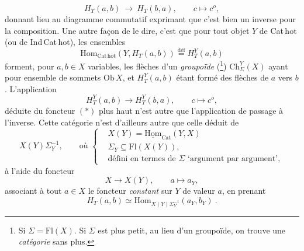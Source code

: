 \[
H_{T}(a,b) \ \longrightarrow\ H_{T}(b,a), \qquad c \longmapsto c^{o}, \tag*{$(*)$}
\]
donnant lieu au diagramme commutatif exprimant que c'est bien un inverse pour la composition. Une autre façon de le dire, c'est que pour tout objet $Y$ de Cat\,hot (ou de Ind\,Cat\,hot), les ensembles
\[
\mathrm{Hom}_{\mathrm{Cat\,hot}}(Y, H_{T}(a,b)) \overset{\text{déf}}{=} H_{T}^{Y}(a,b)
\]
forment, pour $a,b \in X$ variables, les flèches d'un \textit{groupoïde} (\footnote[25]{Si $\Sigma = \mathrm{Fl}(X)$. Si $\Sigma$ est plus petit, au lieu d'un groupoïde, on trouve une \textit{catégorie} sans plus.}) $\mathrm{Ch}_{\Sigma}^{Y}(X)$ ayant pour ensemble de sommets $\mathrm{Ob}\,X$, et $H_{T}^{Y}(a,b)$ étant formé des flèches de $a$ vers $b$. L'application
\[
H_{T}^{Y}(a,b) \longrightarrow H_{T}^{Y}(b,a), \qquad c \longmapsto c^{o},
\]
déduite du foncteur $(*)$ plus haut n'est autre que l'application de passage à l'inverse. Cette catégorie n'est d'ailleurs autre que celle déduit de %
\[
X(Y)\Sigma_{Y}^{-1}, \qquad \text{où } \left\{
\begin{aligned}
&X(Y) = \underline{\mathrm{Hom}}_{\mathrm{Cat}}(Y,X)\\
&\Sigma_{Y} \subseteq \mathrm{Fl}(X(Y)),\\
&\text{défini en termes de } \Sigma \text{ `argument par argument'},
\end{aligned}
\right.
\]
à l'aide du foncteur
\[
X \longrightarrow X(Y), \qquad a \longmapsto a_{Y},
\]
associant à tout $a \in X$ le foncteur \textit{constant} sur $Y$ de valeur $a$, en prenant
\[
H_{T}(a,b) \simeq \mathrm{Hom}_{X(Y)\Sigma_{Y}^{-1}}(a_{Y}, b_{Y}) \ .
\]

